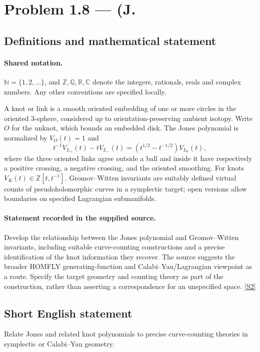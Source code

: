 \documentclass[11pt]{article}
\newcommand{\sref}[2]{\hyperlink{source:#1:#2}{[S#2]}}
\begin{document}
\section{Problem 1.8 — (J.}\label{statement}

\subsection{Definitions and mathematical statement}

\paragraph{Shared notation.}$\mathbb N=\{1,2,\ldots\}$, and $\mathbb Z,\mathbb Q,\mathbb R,\mathbb C$ denote the integers, rationals, reals and complex numbers. Any other conventions are specified locally.


A knot or link is a smooth oriented embedding of one or more circles in the oriented $3$-sphere, considered up to orientation-preserving ambient isotopy. Write $O$ for the unknot, which bounds an embedded disk. The Jones polynomial is normalized by $V_O(t)=1$ and
\[t^{-1}V_{L_+}(t)-tV_{L_-}(t)=(t^{1/2}-t^{-1/2})V_{L_0}(t),\]
where the three oriented links agree outside a ball and inside it have respectively a positive crossing, a negative crossing, and the oriented smoothing. For knots $V_K(t)\in\mathbb Z[t,t^{-1}]$. Gromov--Witten invariants are suitably defined virtual counts of pseudoholomorphic curves in a symplectic target; open versions allow boundaries on specified Lagrangian submanifolds.
\paragraph{Statement recorded in the supplied source.}
Develop the relationship between the Jones polynomial and Gromov--Witten invariants, including suitable curve-counting constructions and a precise identification of the knot information they recover. The source suggests the broader HOMFLY generating-function and Calabi--Yau/Lagrangian viewpoint as a route. Specify the target geometry and counting theory as part of the construction, rather than asserting a correspondence for an unspecified space. \sref{statement}{2}
\subsection{Short English statement}
Relate Jones and related knot polynomials to precise curve-counting theories in symplectic or Calabi--Yau geometry.
\end{document}
